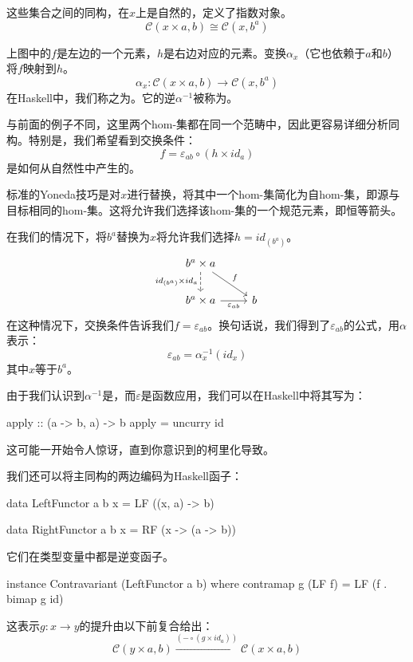 \documentclass[DaoFP]{subfiles}
\begin{document}
这些集合之间的同构，在$x$上是自然的，定义了指数对象。
\[\mathcal{C}(x \times a, b) \cong \mathcal{C}(x, b^a)\]

上图中的$f$是左边的一个元素，$h$是右边对应的元素。变换$\alpha_x$（它也依赖于$a$和$b$）将$f$映射到$h$。
\[ \alpha_x \colon \mathcal{C}(x \times a, b) \to \mathcal{C}(x, b^a) \]
在Haskell中，我们称之为。它的逆$\alpha^{-1}$被称为。

与前面的例子不同，这里两个hom-集都在同一个范畴中，因此更容易详细分析同构。特别是，我们希望看到交换条件：
\[  f = \varepsilon_{a b} \circ (h \times id_a) \]
是如何从自然性中产生的。

标准的Yoneda技巧是对$x$进行替换，将其中一个hom-集简化为自hom-集，即源与目标相同的hom-集。这将允许我们选择该hom-集的一个规范元素，即恒等箭头。

在我们的情况下，将$b^a$替换为$x$将允许我们选择$h = id_{(b^a)}$。
\[
 \begin{tikzcd}
 b^a \times a
 \arrow[d, dashed, "id_{(b^a)} \times id_a"']
 \arrow[rd, "f"]
 \\
 b^a \times a
 \arrow[r, "\varepsilon_{a b}"']
& b
 \end{tikzcd}
\]
在这种情况下，交换条件告诉我们$f = \varepsilon_{a b}$。换句话说，我们得到了$\varepsilon_{a b}$的公式，用$\alpha$表示：
\[ \varepsilon_{a b} = \alpha_{x}^{-1} (id_{x}) \]
其中$x$等于$b^a$。

由于我们认识到$\alpha^{-1}$是，而$\varepsilon$是函数应用，我们可以在Haskell中将其写为：
\begin{haskell}
apply :: (a -> b, a) -> b
apply = uncurry id
\end{haskell}
这可能一开始令人惊讶，直到你意识到的柯里化导致。

我们还可以将主同构的两边编码为Haskell函子：
\begin{haskell}
data LeftFunctor  a b x = LF ((x, a) -> b)
\end{haskell}
\begin{haskell}
data RightFunctor a b x = RF (x -> (a -> b))
\end{haskell}
它们在类型变量中都是逆变函子。
\begin{haskell}
instance Contravariant (LeftFunctor a b) where
  contramap g (LF f) = LF (f . bimap g id)
\end{haskell}
这表示$g \colon x \to y$的提升由以下前复合给出：
\[ \mathcal{C}(y \times a, b) \xrightarrow{(- \circ (g \times id_a)) }  \mathcal{C}(x \times a, b)\]
\end{document}
